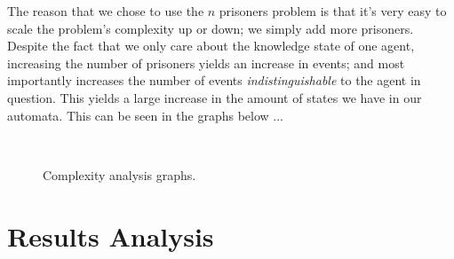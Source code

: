 \documentclass[10pt, a4paper]{report}
\begin{document}
The reason that we chose to use the $n$ prisoners problem is that it's very easy
to scale the problem's complexity up or down; we simply add more prisoners.
Despite the fact that we only care about the knowledge state of one agent,
increasing the number of prisoners yields an increase in events; and most
importantly increases the number of events \emph{indistinguishable} to the agent
in question. This yields a large increase in the amount of states we have in our
automata. This can be seen in the graphs below ... 

\begin{figure}
  \centering
  \begin{subfigure}[b]{0.3\textwidth}
  \end{subfigure}%
 ~ 
  \begin{subfigure}[b]{0.3\textwidth}
  \end{subfigure}
  \label{fig:graphs}
  \caption{Complexity analysis graphs.}
\end{figure}

\section{Results Analysis}

\subsection{}
\end{document}

